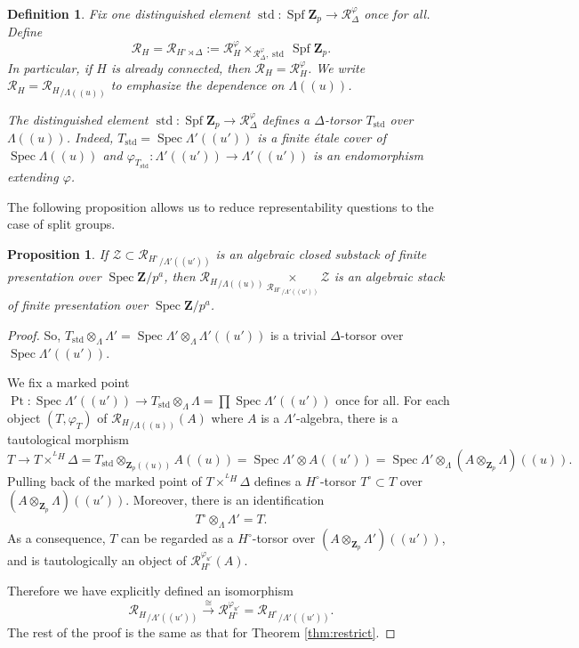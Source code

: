\documentclass[11pt]{amsart}
\newtheorem{prop}{Proposition}
\newtheorem{dfn}{Definition}
\numberwithin{thm}{section}
\numberwithin{lem}{section}
\numberwithin{cor}{section}
\numberwithin{prop}{section}
\numberwithin{exam}{section}
\numberwithin{dfn}{section}
\newcommand{\std}{\operatorname{std}}
\newcommand{\Pt}{\operatorname{Pt}}
\newcommand{\spf}{\operatorname{Spf}}
\newcommand{\spec}{\operatorname{Spec}}
\newcommand{\cZ}{\mathcal{Z}}
\newcommand{\clR}{\mathcal{R}}
\newcommand{\Z}{\mathbf{Z}}
\newcommand{\lsup}[2]{{^{#1}\!#2}}
\begin{document}
\begin{dfn}
Fix one distinguished element
$\std: \spf \Z_p\to \clR_\Delta^\varphi$
once for all.
Define
\[
\clR_H=\clR_{H^\circ\rtimes \Delta}:=
\clR^\varphi_H \times_{\clR^\varphi_\Delta, \std}\spf \Z_p.
\]
In particular,
if $H$ is already connected,
then $\clR_H=\clR_H^\varphi$.
We write $\clR_H={\clR_H}_{/\Lambda(\!(u)\!)}$
to emphasize the dependence on 
$\Lambda(\!(u)\!)$.

The distinguished element
$\std:\spf \Z_p\to \clR_\Delta^\varphi$
defines
a $\Delta$-torsor
$T_{\std}$
over $\Lambda(\!(u)\!)$.
Indeed,
$T_{\std}=\spec \Lambda'(\!(u')\!)$
is a finite \'etale cover of $\spec \Lambda(\!(u)\!)$
and
$\varphi_{T_{\std}}:
\Lambda'(\!(u')\!)\to \Lambda'(\!(u')\!)$
is an endomorphism extending
$\varphi$.
\end{dfn}

The following proposition
allows us to reduce representability questions
to the case of split groups.

\begin{prop}
If $\cZ\subset {\clR_{H^\circ}}_{/\Lambda'(\!(u')\!)}$
is an algebraic closed substack
of finite presentation over $\spec \Z/p^a$,
then
${\clR_H}_{/\Lambda(\!(u)\!)}
\underset{{\clR_{H^\circ}}_{/\Lambda'(\!(u')\!)}}{\times}
\cZ$
is an algebraic stack of finite presentation over
$\spec \Z/p^a$.
\label{prop:restrict}
\end{prop}

\begin{proof}
So,
$T_{\std}\otimes_\Lambda \Lambda'
=\spec \Lambda'\otimes_\Lambda\Lambda'(\!(u')\!)$
is a trivial $\Delta$-torsor
over $\spec \Lambda'(\!(u')\!)$.


We fix a marked point
$\Pt:\spec \Lambda'(\!(u')\!)\to T_{\std}\otimes_\Lambda \Lambda
=\prod \spec \Lambda'(\!(u')\!)$
once for all.
For each object $(T, \varphi_T)$
of ${\clR_{H}}_{/\Lambda(\!(u)\!)}(A)$
where $A$ is a $\Lambda'$-algebra,
there is a tautological morphism
\[
T\to 
T\times^{\lsup LH}\Delta=T_{\std}\otimes_{\Z_p(\!(u)\!)}A(\!(u)\!)
=\spec \Lambda'\otimes A(\!(u')\!)
=\spec \Lambda'\otimes_\Lambda(A\otimes_{\Z_p}\Lambda)(\!(u)\!).
\]
Pulling back of the marked point 
of $T\times^{\lsup LH}\Delta$
defines
a $H^\circ$-torsor
$T^\circ\subset T$
over $(A\otimes_{\Z_p}\Lambda)(\!(u')\!)$.
Moreover, there is an identification
\[
T^\circ \otimes_\Lambda\Lambda'
=T.
\]
As a consequence,
$T$ can be regarded
as a $H^\circ$-torsor
over $(A\otimes_{\Z_p}\Lambda')(\!(u')\!)$,
and is tautologically an object
of 
$\clR^{\varphi_{u'}}_{H^\circ}(A)$.

Therefore we have explicitly defined an isomorphism
\[
{\clR_H}_{/\Lambda'(\!(u')\!)}
\xrightarrow{\cong}
\clR^{\varphi_{u'}}_{H^\circ}
=
{\clR_{H^\circ}}_{/\Lambda'(\!(u')\!)}.
\]
The rest of the proof is the same as that for
Theorem \ref{thm:restrict}.
\end{proof}
\end{document}
